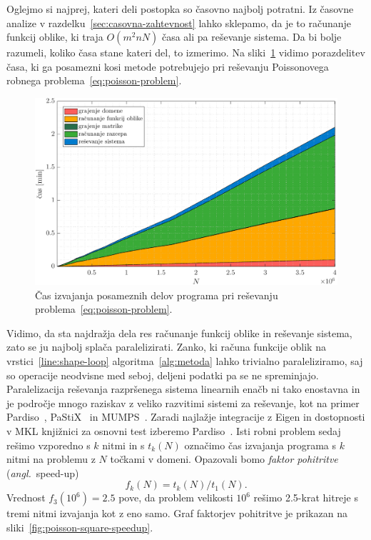 \documentclass[12pt,a4paper,twoside]{article}
\theoremstyle{definition} %
\theoremstyle{plain} %
\numberwithin{equation}{section}
\newcommand{\ang}[1]{(\hspace{-1.5px}\textit{angl.}\ #1)}
\newlength{\iw}
\begin{document}
Oglejmo si najprej, kateri deli postopka so časovno najbolj potratni. Iz časovne analize v
razdelku~\ref{sec:casovna-zahtevnost} lahko sklepamo, da je to računanje funkcij oblike,
ki traja $O(m^2n N)$ časa ali pa reševanje sistema. Da bi bolje razumeli, koliko časa stane kateri
del, to izmerimo. Na sliki~\ref{fig:poisson-square-time-distribution} vidimo porazdelitev časa, ki ga posamezni
kosi metode potrebujejo pri reševanju Poissonovega robnega problema~\eqref{eq:poisson-problem}.

\begin{figure}[!h]
  \centering
  \includegraphics[width=\iw]{images/poisson_square_time_distribution_1.pdf}
  \caption[Čas izvajanja delov programa pri reševanju Poissonove enačbe.]{Čas
  izvajanja posameznih delov programa pri reševanju
  problema~\eqref{eq:poisson-problem}.}
  \label{fig:poisson-square-time-distribution}
\end{figure}

Vidimo, da sta najdražja dela res računanje funkcij oblike in reševanje sistema, zato se ju najbolj
splača paralelizirati. Zanko, ki računa funkcije oblik na vrstici~\ref{line:shape-loop}
algoritma~\ref{alg:metoda} lahko trivialno paraleliziramo, saj so operacije neodvisne med seboj,
deljeni podatki pa se ne spreminjajo. Paralelizacija reševanja razpršenega sistema linearnih enačb
ni tako enostavna in je področje mnogo raziskav z veliko razvitimi sistemi za reševanje, kot na
primer Pardiso~\cite{pardiso}, PaStiX~\cite{henon2002pastix} in MUMPS~\cite{amestoy2000mumps}.
Zaradi najlažje integracije z Eigen in dostopnosti v MKL knjižnici za osnovni test izberemo
Pardiso~\cite{pardiso}. Isti robni problem sedaj rešimo vzporedno s $k$ nitmi in s $t_k(N)$ označimo
čas izvajanja programa s $k$ nitmi na problemu z $N$ točkami v domeni. Opazovali bomo \emph{faktor
pohitritve} \ang{speed-up}
\begin{equation}
   f_k(N) = t_k(N) / t_1(N).
\end{equation}
Vrednost $f_3(10^6) = 2.5$ pove, da problem velikosti $10^6$ rešimo 2.5-krat hitreje s tremi
nitmi izvajanja kot z eno samo. Graf faktorjev pohitritve je prikazan na
sliki~\ref{fig:poisson-square-speedup}.
\end{document}
